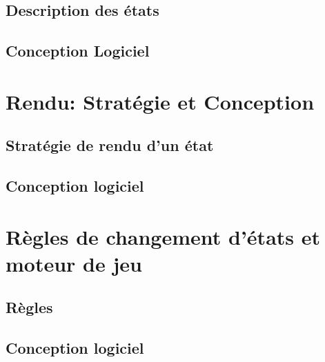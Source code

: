 \documentclass[a4paper,12pt]{article}
\begin{document}
\subsection{Description des états}


\subsection{Conception Logiciel}



\clearpage
\section{Rendu: Stratégie et Conception}

\subsection{Stratégie de rendu d'un état}


\subsection{Conception logiciel}


\clearpage
\section{Règles de changement d'états et moteur de jeu}

\subsection{Règles}

\clearpage
\subsection{Conception logiciel}
\end{document}
